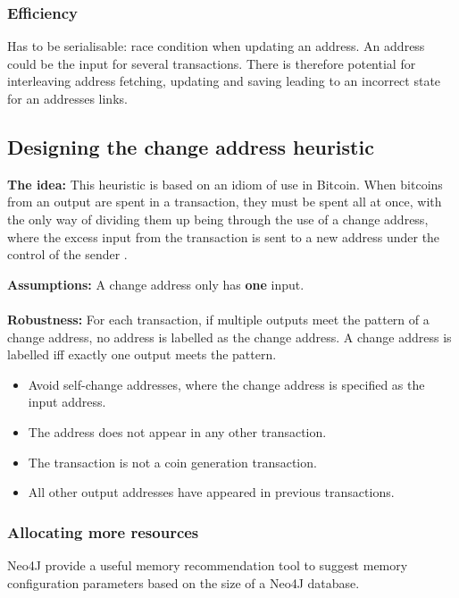 \begin{itemize}
\subsubsection{Efficiency}
Has to be serialisable: race condition when updating an address. An address could be the input for several transactions. There is therefore potential for interleaving address fetching, updating and saving leading to an incorrect state for an addresses links.  

\subsection{Designing the change address heuristic}
\textbf{The idea:} This heuristic is based on an idiom of use in Bitcoin. When bitcoins from an output are spent in a transaction, they must be spent all at once, with the only way of dividing them up being through the use of a change address, where the excess input from the transaction is sent to a new address under the control of the sender .

\textbf{Assumptions:} A change address only has \textbf{one} input. \\\\
\textbf{Robustness:} 
For each transaction, if multiple outputs meet the pattern of a change address, no address is labelled as the change address. A change address is labelled iff exactly one output meets the pattern. 
\begin{itemize}
    \item Avoid self-change addresses, where the change address is specified as the input address. 
    \item The address does not appear in any other transaction.
    \item The transaction is not a coin generation transaction. 
    \item All other output addresses have appeared in previous transactions.
\end{itemize}




\subsubsection{Allocating more resources}
Neo4J provide a useful memory recommendation tool to suggest memory configuration parameters based on the size of a Neo4J database. 



    
    
\end{itemize}